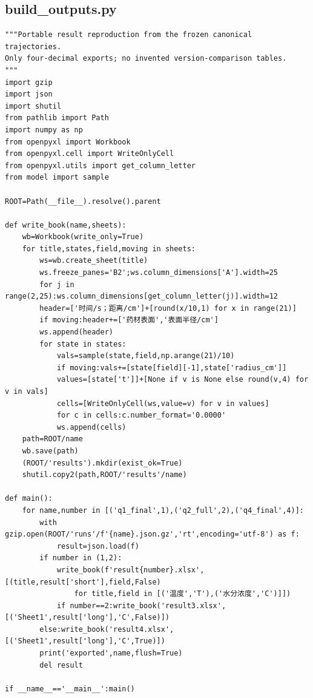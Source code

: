 \subsection{build\_outputs.py}
\begin{verbatim}
"""Portable result reproduction from the frozen canonical trajectories.
Only four-decimal exports; no invented version-comparison tables.
"""
import gzip
import json
import shutil
from pathlib import Path
import numpy as np
from openpyxl import Workbook
from openpyxl.cell import WriteOnlyCell
from openpyxl.utils import get_column_letter
from model import sample

ROOT=Path(__file__).resolve().parent

def write_book(name,sheets):
    wb=Workbook(write_only=True)
    for title,states,field,moving in sheets:
        ws=wb.create_sheet(title)
        ws.freeze_panes='B2';ws.column_dimensions['A'].width=25
        for j in range(2,25):ws.column_dimensions[get_column_letter(j)].width=12
        header=['时间/s；距离/cm']+[round(x/10,1) for x in range(21)]
        if moving:header+=['药材表面','表面半径/cm']
        ws.append(header)
        for state in states:
            vals=sample(state,field,np.arange(21)/10)
            if moving:vals+=[state[field][-1],state['radius_cm']]
            values=[state['t']]+[None if v is None else round(v,4) for v in vals]
            cells=[WriteOnlyCell(ws,value=v) for v in values]
            for c in cells:c.number_format='0.0000'
            ws.append(cells)
    path=ROOT/name
    wb.save(path)
    (ROOT/'results').mkdir(exist_ok=True)
    shutil.copy2(path,ROOT/'results'/name)

def main():
    for name,number in [('q1_final',1),('q2_full',2),('q4_final',4)]:
        with gzip.open(ROOT/'runs'/f'{name}.json.gz','rt',encoding='utf-8') as f:
            result=json.load(f)
        if number in (1,2):
            write_book(f'result{number}.xlsx',[(title,result['short'],field,False)
                for title,field in [('温度','T'),('水分浓度','C')]])
            if number==2:write_book('result3.xlsx',[('Sheet1',result['long'],'C',False)])
        else:write_book('result4.xlsx',[('Sheet1',result['long'],'C',True)])
        print('exported',name,flush=True)
        del result

if __name__=='__main__':main()

\end{verbatim}

